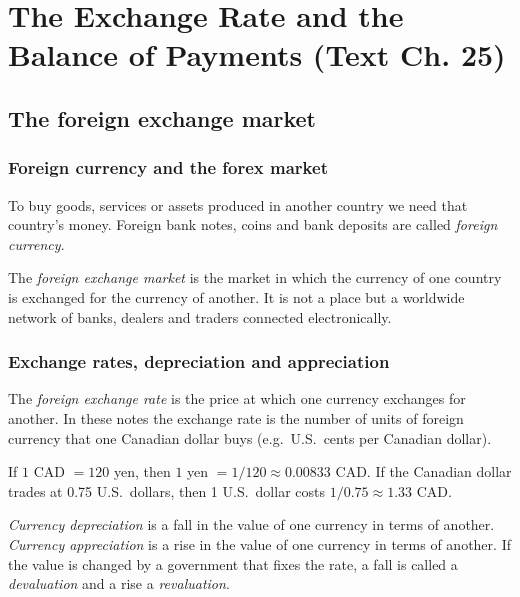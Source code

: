 \chapter{The Exchange Rate and the Balance of Payments (Text Ch. 25)}

\section{The foreign exchange market}

\subsection{Foreign currency and the forex market}

To buy goods, services or assets produced in another country we need that country's
money. Foreign bank notes, coins and bank deposits are called \emph{foreign currency}.

\begin{definition}
The \emph{foreign exchange market} is the market in which the currency of one country
is exchanged for the currency of another. It is not a place but a worldwide network of
banks, dealers and traders connected electronically.
\end{definition}

\subsection{Exchange rates, depreciation and appreciation}

\begin{definition}
The \emph{foreign exchange rate} is the price at which one currency exchanges for another.
In these notes the exchange rate is the number of units of foreign currency that one
Canadian dollar buys (e.g.\ U.S.\ cents per Canadian dollar).
\end{definition}

\begin{example}
If $1$ CAD $= 120$ yen, then $1$ yen $= 1/120 \approx 0.00833$ CAD. If the Canadian dollar
trades at 0.75 U.S.\ dollars, then 1 U.S.\ dollar costs $1/0.75 \approx 1.33$ CAD.
\end{example}

\begin{definition}
\emph{Currency depreciation} is a fall in the value of one currency in terms of another.
\emph{Currency appreciation} is a rise in the value of one currency in terms of another.
If the value is changed by a government that fixes the rate, a fall is called a
\emph{devaluation} and a rise a \emph{revaluation}.
\end{definition}

